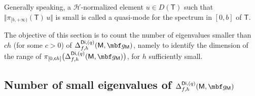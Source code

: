Generally speaking, a $\mathcal H$-normalized element $u\in D\left (\mathsf T\right)$
such that $\Vert \pi_{[b,+\infty)} (\mathsf T) \, u \Vert$ is small is
called a quasi-mode for the spectrum in $[0,b]$ of $\mathsf T$.

The objective of this section is to count
the number of eigenvalues smaller than $ch$ (for some $c>0$) of
$\Delta_{f,h}^{\mathsf{Di},(q)}(\mathsf M,\mbf g_{\mathsf M})$,
namely to identify the dimension of the range of $\pi_{[0,\mathsf
ch]}\bigl(\Delta_{f,h}^{\mathsf{Di},(q)}(\mathsf M,\mbf g_{\mathsf
M}) \bigr)$, for $h$ sufficiently small.

\subsection{Number of small eigenvalues of
$\Delta_{f,h}^{\mathsf{Di},(q)}(\mathsf M,\mbf g_{\mathsf M})$}
\label{sec.mainresult_petitevp}


